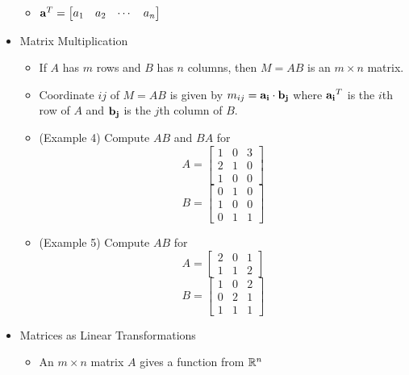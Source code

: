 \documentclass[11pt]{article}
\begin{document}
\begin{itemize}
\begin{itemize}
      \item
        \(
          \mathbf{a}^T
            =
          \begin{bmatrix}
            a_{1} & a_{2} & \cdots & a_{n}
          \end{bmatrix}
        \)
    \end{itemize}
  \item Matrix Multiplication
    \begin{itemize}
      \item
        If \(A\) has \(m\) rows and \(B\) has \(n\) columns,
        then \(M=AB\) is an \(m\times n\) matrix.
      \item
        Coordinate \(ij\) of \(M=AB\) is given by
        \(m_{ij}=\mathbf{a_i}\cdot\mathbf{b_j}\)
        where \(\mathbf{a_i}^T\) is the \(i\)th row of \(A\)
        and \(\mathbf{b_j}\) is the \(j\)th column of \(B\).
      \item
        (Example 4) Compute \(AB\) and \(BA\) for
        \[
          A =
          \begin{bmatrix}
            1 & 0 & 3 \\
            2 & 1 & 0 \\
            1 & 0 & 0
          \end{bmatrix}
        \]
        \[
          B =
          \begin{bmatrix}
            0 & 1 & 0 \\
            1 & 0 & 0 \\
            0 & 1 & 1
          \end{bmatrix}
        \]
      \item
        (Example 5) Compute \(AB\) for
        \[
          A =
          \begin{bmatrix}
            2 & 0 & 1 \\
            1 & 1 & 2
          \end{bmatrix}
        \]
        \[
          B =
          \begin{bmatrix}
            1 & 0 & 2 \\
            0 & 2 & 1 \\
            1 & 1 & 1
          \end{bmatrix}
        \]
    \end{itemize}
  \item Matrices as Linear Transformations
    \begin{itemize}
      \item An \(m\times n\) matrix \(A\) gives a function from \(\mathbb R^n\)

\end{itemize}
\end{itemize}
\end{document}
